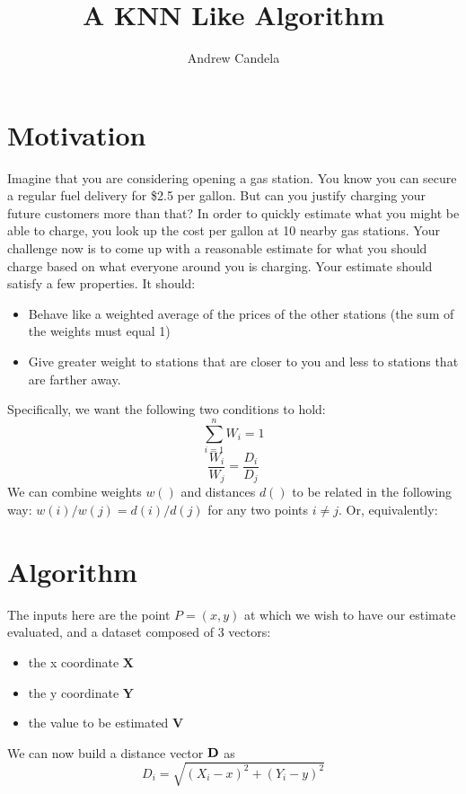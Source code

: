 \documentclass[11pt, oneside]{article}   	%
\title{A KNN Like Algorithm}
\author{Andrew Candela}
\begin{document}
\maketitle
\section*{Motivation}Imagine that you are considering opening a gas station. You know you can secure a regular fuel delivery for \$2.5 per gallon. But can you justify charging your future customers more than that? In order to quickly estimate what you might be able to charge, you look up the cost per gallon at 10 nearby gas stations. Your challenge now is to come up with a reasonable estimate for what you should charge based on what everyone around you is charging.
Your estimate should satisfy a few properties. It should:
\begin{itemize}
\item{Behave like a weighted average of the prices of the other stations (the sum of the weights must equal 1)}
\item{Give greater weight to stations that are closer to you and less to stations that are farther away.}
\end{itemize}
Specifically, we want the following two conditions to hold:
\begin{equation}
\sum_{i=1}^n W_i = 1
\end{equation}
\begin{equation}
\frac{W_i}{W_j}=\frac{D_i}{D_j}
\end{equation}
We can combine 
weights $w()$ and distances $d()$ to be related in the following way: $w(i)/w(j) = d(i)/d(j)$ for any two points $i \neq j$. Or, equivalently: \[\]


\section*{Algorithm}
The inputs here are the point $P=(x,y)$ at which we wish to have our estimate evaluated, and a dataset composed of 3 vectors: 
\begin{itemize}
\item{the x coordinate $\bm{X}$} 
\item{the y coordinate $\bm{Y}$} 
\item{the value to be estimated $\bm{V}$}
\end{itemize}
We can now build a distance vector $\bf{D}$ as 
\[
D_i=\sqrt{(X_i - x)^2+(Y_i - y)^2}
\]
\end{document}
